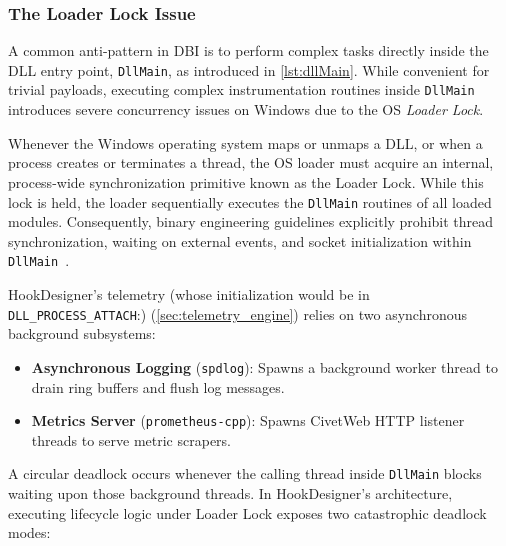 \subsubsection{The Loader Lock Issue}
\label{subsec:lock_issue}

A common anti-pattern in \ac{DBI} is to perform complex tasks directly inside the \ac{DLL} entry point, \texttt{DllMain}, as introduced in \cref{lst:dllMain}.
While convenient for trivial payloads, executing complex instrumentation routines inside \texttt{DllMain} introduces severe concurrency issues on Windows due to the OS \emph{Loader Lock}.

Whenever the Windows operating system maps or unmaps a \ac{DLL}, or when a process creates or terminates a thread, the OS loader must acquire an internal, process-wide synchronization primitive known as the Loader Lock.
While this lock is held, the loader sequentially executes the \texttt{DllMain} routines of all loaded modules.
Consequently, binary engineering guidelines explicitly prohibit thread synchronization, waiting on external events, and socket initialization within \texttt{DllMain}~\cite{doc:msdn_dll_best_practices}.

HookDesigner's telemetry (whose initialization would be in \texttt{DLL\_PROCESS\_ATTACH}:) (\cref{sec:telemetry_engine}) relies on two asynchronous background subsystems:
\begin{itemize}
	\item \textbf{Asynchronous Logging} (\texttt{spdlog}): Spawns a background worker thread to drain ring buffers and flush log messages.
	\item \textbf{Metrics Server} (\texttt{prometheus-cpp}): Spawns CivetWeb HTTP listener threads to serve metric scrapers.
\end{itemize}

A circular deadlock occurs whenever the calling thread inside \texttt{DllMain} blocks waiting upon those background threads.
In HookDesigner's architecture, executing lifecycle logic under Loader Lock exposes two catastrophic deadlock modes:

